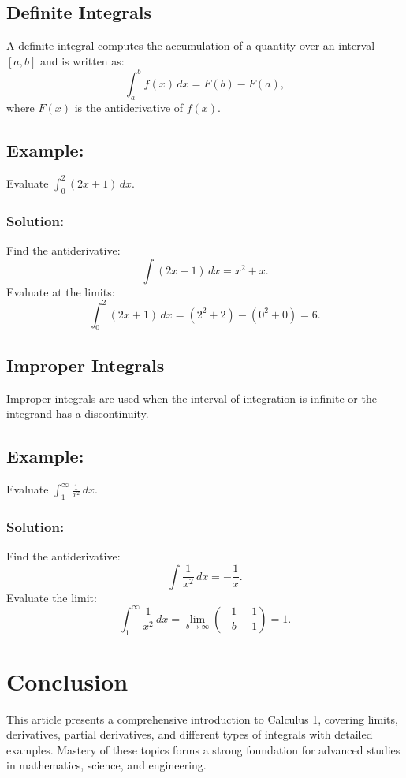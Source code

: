 \documentclass[12pt]{article}
\begin{document}
\subsection{Definite Integrals}
A definite integral computes the accumulation of a quantity over an interval $[a, b]$ and is written as:
\[ \int_a^b f(x)\,dx = F(b) - F(a), \]
where $F(x)$ is the antiderivative of $f(x)$.

\subsection*{Example:}
Evaluate $\int_0^2 (2x + 1)\,dx$.

\subsubsection*{Solution:}
Find the antiderivative:
\[ \int (2x + 1)\,dx = x^2 + x. \]
Evaluate at the limits:
\[ \int_0^2 (2x + 1)\,dx = (2^2 + 2) - (0^2 + 0) = 6. \]

\subsection{Improper Integrals}
Improper integrals are used when the interval of integration is infinite or the integrand has a discontinuity.

\subsection*{Example:}
Evaluate $\int_1^\infty \frac{1}{x^2}\,dx$.

\subsubsection*{Solution:}
Find the antiderivative:
\[ \int \frac{1}{x^2}\,dx = -\frac{1}{x}. \]
Evaluate the limit:
\[ \int_1^\infty \frac{1}{x^2}\,dx = \lim_{b \to \infty} \left(-\frac{1}{b} + \frac{1}{1}\right) = 1. \]

\section*{Conclusion}
This article presents a comprehensive introduction to Calculus 1, covering limits, derivatives, partial derivatives, and different types of integrals with detailed examples. Mastery of these topics forms a strong foundation for advanced studies in mathematics, science, and engineering.
\end{document}
